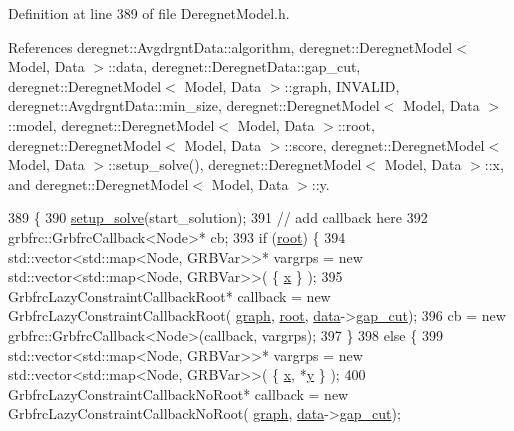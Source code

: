 Definition at line 389 of file Deregnet\+Model.\+h.



References deregnet\+::\+Avgdrgnt\+Data\+::algorithm, deregnet\+::\+Deregnet\+Model$<$ Model, Data $>$\+::data, deregnet\+::\+Deregnet\+Data\+::gap\+\_\+cut, deregnet\+::\+Deregnet\+Model$<$ Model, Data $>$\+::graph, I\+N\+V\+A\+L\+ID, deregnet\+::\+Avgdrgnt\+Data\+::min\+\_\+size, deregnet\+::\+Deregnet\+Model$<$ Model, Data $>$\+::model, deregnet\+::\+Deregnet\+Model$<$ Model, Data $>$\+::root, deregnet\+::\+Deregnet\+Model$<$ Model, Data $>$\+::score, deregnet\+::\+Deregnet\+Model$<$ Model, Data $>$\+::setup\+\_\+solve(), deregnet\+::\+Deregnet\+Model$<$ Model, Data $>$\+::x, and deregnet\+::\+Deregnet\+Model$<$ Model, Data $>$\+::y.


\begin{DoxyCode}
389                                                                                                 \{
390     \hyperlink{classderegnet_1_1DeregnetModel_a502657403c84cbdc66ad845c56dee339}{setup\_solve}(start\_solution);
391     \textcolor{comment}{// add callback here}
392     grbfrc::GrbfrcCallback<Node>* cb;
393     \textcolor{keywordflow}{if} (\hyperlink{classderegnet_1_1DeregnetModel_a54b20393a0e26d65935d387685d7fe96}{root}) \{
394         std::vector<std::map<Node, GRBVar>>* vargrps = \textcolor{keyword}{new} std::vector<std::map<Node, GRBVar>>( \{ 
      \hyperlink{classderegnet_1_1DeregnetModel_a360c980f3fec4dfbab50e9bb06a933a8}{x} \} );
395         GrbfrcLazyConstraintCallbackRoot* callback = \textcolor{keyword}{new} GrbfrcLazyConstraintCallbackRoot(
      \hyperlink{classderegnet_1_1DeregnetModel_a3cd2f54b8e061ef5bed32708d9bc1ef1}{graph}, \hyperlink{classderegnet_1_1DeregnetModel_a54b20393a0e26d65935d387685d7fe96}{root}, \hyperlink{classderegnet_1_1DeregnetModel_ad5399761cf6293a702f3800bda4806d1}{data}->\hyperlink{classderegnet_1_1DeregnetData_a3637c87366454adc152487fc2f5cfede}{gap\_cut});
396         cb = \textcolor{keyword}{new} grbfrc::GrbfrcCallback<Node>(callback, vargrps);
397     \}
398     \textcolor{keywordflow}{else} \{
399         std::vector<std::map<Node, GRBVar>>* vargrps = \textcolor{keyword}{new} std::vector<std::map<Node, GRBVar>>( \{ 
      \hyperlink{classderegnet_1_1DeregnetModel_a360c980f3fec4dfbab50e9bb06a933a8}{x}, *\hyperlink{classderegnet_1_1DeregnetModel_ae76df61afe302b939165facf3dd21ac8}{y} \} );
400         GrbfrcLazyConstraintCallbackNoRoot* callback = \textcolor{keyword}{new} GrbfrcLazyConstraintCallbackNoRoot(
      \hyperlink{classderegnet_1_1DeregnetModel_a3cd2f54b8e061ef5bed32708d9bc1ef1}{graph}, \hyperlink{classderegnet_1_1DeregnetModel_ad5399761cf6293a702f3800bda4806d1}{data}->\hyperlink{classderegnet_1_1DeregnetData_a3637c87366454adc152487fc2f5cfede}{gap\_cut});

\end{DoxyCode}
